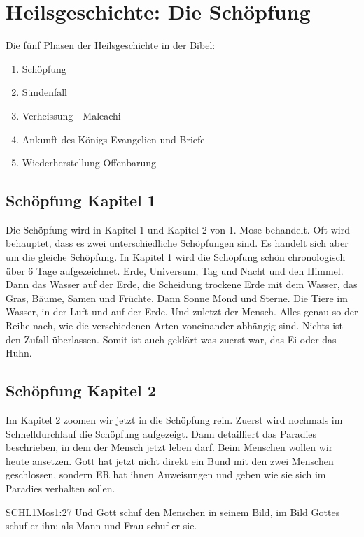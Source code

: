 \section{Heilsgeschichte: Die Schöpfung}
 Die fünf Phasen der Heilsgeschichte in der Bibel:
    \begin{enumerate}
    \item Schöpfung 
    \item Sündenfall 
    \item Verheissung  - Maleachi
    \item Ankunft des Königs Evangelien und Briefe
    \item Wiederherstellung Offenbarung
   \end{enumerate}        
   
    \subsection{Schöpfung Kapitel 1}
       Die Schöpfung wird in Kapitel 1 und Kapitel 2 von 1. Mose behandelt. Oft wird behauptet, dass es zwei unterschiedliche Schöpfungen sind. Es handelt sich aber um die gleiche Schöpfung. In  Kapitel 1 wird die Schöpfung schön chronologisch über 6 Tage aufgezeichnet. Erde, Universum, Tag und Nacht und den Himmel. Dann das Wasser auf der Erde, die Scheidung trockene Erde mit dem Wasser, das Gras, Bäume, Samen und Früchte. Dann Sonne Mond und Sterne. Die Tiere im Wasser, in der Luft und auf der Erde. Und zuletzt der Mensch.
       Alles genau so der Reihe nach, wie die verschiedenen Arten voneinander abhängig sind. Nichts ist den Zufall überlassen. Somit ist auch geklärt was zuerst war, das Ei oder das Huhn. 


   \subsection{Schöpfung Kapitel 2}
    Im Kapitel 2 zoomen wir jetzt in die Schöpfung rein. Zuerst wird nochmals im Schnelldurchlauf die Schöpfung aufgezeigt. Dann detailliert das Paradies beschrieben, in dem der Mensch jetzt leben darf. Beim Menschen wollen wir heute ansetzen. Gott hat jetzt nicht direkt ein Bund mit den zwei Menschen geschlossen, sondern ER hat ihnen Anweisungen und  geben wie sie sich im Paradies verhalten sollen. 
    \begin{bibelbox}{SCHL}{1Mos}{1:27}
        Und Gott schuf den Menschen in seinem Bild, im Bild Gottes schuf er ihn; als Mann und Frau schuf er sie.
    \end{bibelbox}

